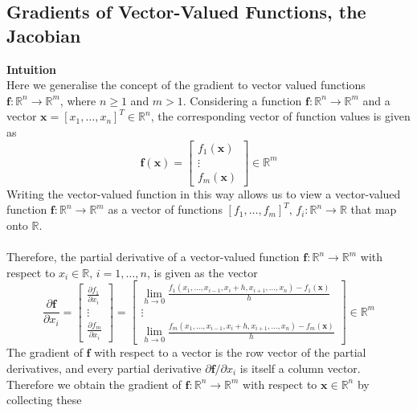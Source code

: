 \documentclass{report}
\begin{document}
\subsection{Gradients of Vector-Valued Functions, the Jacobian}%
\textbf{Intuition}\\
Here we generalise the concept of the gradient to vector valued functions $\bm{f}:\mathbb{R}^n\to\mathbb{R}^m$, 
where $n\geq1$ and $m>1$. Considering a function $\bm{f}:\mathbb{R}^n\to\mathbb{R}^m$ and a vector
$\bm{x}=[x_1,\ldots,x_n]^T\in\mathbb{R}^n$, the corresponding vector of function values is given as
\begin{equation*}
\bm{f}(\bm{x})=\begin{bmatrix}f_1(\bm{x})\\\vdots\\
f_m(\bm{x})\end{bmatrix}\in\mathbb{R}^m
\end{equation*}
Writing the vector-valued function in this way allows us to view a vector-valued function $\bm{f}:\mathbb{R}^n
\to\mathbb{R}^m$ as a vector of functions $[f_1,\ldots,f_m]^T,\,f_i:\mathbb{R}^n\to\mathbb{R}$ that map 
onto $\mathbb{R}$.\\
\vspace{1mm}\\
Therefore, the partial derivative of a vector-valued function $\bm{f}:\mathbb{R}^n\to\mathbb{R}^m$ with respect 
to $x_i\in\mathbb{R},\,i=1,\ldots,n$, is given as the vector
\begin{equation*}
\frac{\partial\bm{f}}{\partial x_i}=\begin{bmatrix}
\frac{\partial f_1}{\partial x_i}\\\vdots\\
\frac{\partial f_m}{\partial x_i}\end{bmatrix}=
\begin{bmatrix}
\lim_{h\to0}\frac{f_1(x_1,\ldots,x_{i-1},x_i+h,x_{i+1},\ldots,x_n)-f_1(\bm{x})}{h}\\\vdots\\
\lim_{h\to0}\frac{f_m(x_1,\ldots,x_{i-1},x_i+h,x_{i+1},\ldots,x_n)-f_m(\bm{x})}{h}
\end{bmatrix}\in\mathbb{R}^m
\end{equation*}
The gradient of $\bm{f}$ with respect to a vector is the row vector of the partial derivatives, and every partial
derivative $\partial\bm{f}/\partial x_i$ is itself a column vector. Therefore we obtain the gradient of 
$\bm{f}:\mathbb{R}^n\to\mathbb{R}^m$ with respect to $\bm{x}\in\mathbb{R}^n$ by collecting these 
\end{document}
